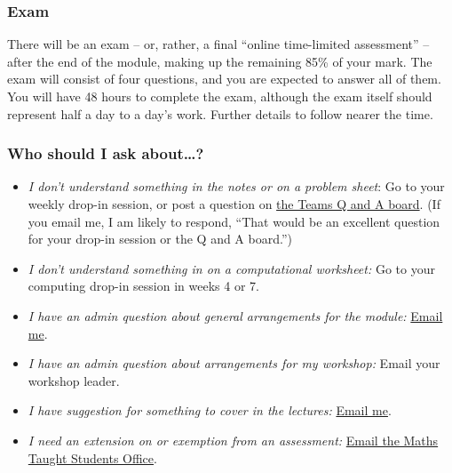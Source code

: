 \documentclass[
  a4paper,
]{article}
\providecommand{\tightlist}{%
  \setlength{\itemsep}{0pt}\setlength{\parskip}{0pt}}
\theoremstyle{definition}
\theoremstyle{definition}
\theoremstyle{definition}
\theoremstyle{remark}
\begin{document}
\hypertarget{exam}{%
\subsubsection*{Exam}\label{exam}}

There will be an exam -- or, rather, a final ``online time-limited assessment'' -- after the end of the module, making up the remaining 85\% of your mark. The exam will consist of four questions, and you are expected to answer all of them. You will have 48 hours to complete the exam, although the exam itself should represent half a day to a day's work. Further details to follow nearer the time.

\hypertarget{ask}{%
\subsubsection*{Who should I ask about\ldots?}\label{ask}}

\begin{itemize}
\tightlist
\item
  \emph{I don't understand something in the notes or on a problem sheet}: Go to your weekly drop-in session, or post a question on \href{https://teams.microsoft.com/l/channel/19\%3a5fcd058b7074426ca1f7d1cf2052d3b4\%40thread.tacv2/Q\%2520and\%2520A?groupId=1c138eac-0c54-43b0-9d20-d4cf3d65c40a\&tenantId=bdeaeda8-c81d-45ce-863e-5232a535b7cb}{the Teams Q and A board}. (If you email me, I am likely to respond, ``That would be an excellent question for your drop-in session or the Q and A board.'')
\item
  \emph{I don't understand something in on a computational worksheet:} Go to your computing drop-in session in weeks 4 or 7.
\item
  \emph{I have an admin question about general arrangements for the module:} \href{mailto:m.aldridge@leeds.ac.uk}{Email me}.
\item
  \emph{I have an admin question about arrangements for my workshop:} Email your workshop leader.
\item
  \emph{I have suggestion for something to cover in the lectures:} \href{mailto:m.aldridge@leeds.ac.uk}{Email me}.
\item
  \emph{I need an extension on or exemption from an assessment:} \href{mailto:Maths.Taught.Students@leeds.ac.uk}{Email the Maths Taught Students Office}.
\end{itemize}
\end{document}
